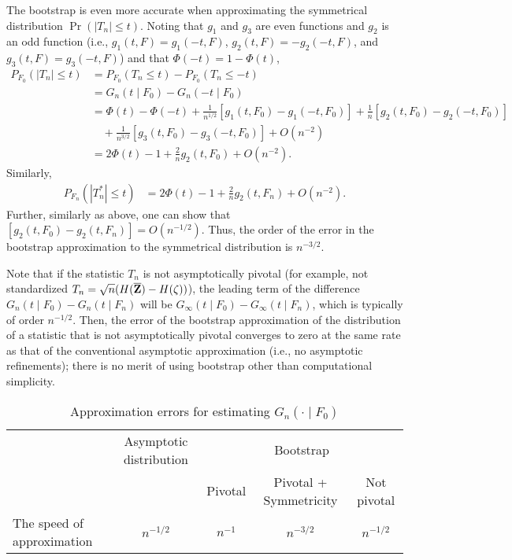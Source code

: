 \documentclass[11pt, A4paper, openany, uplatex]{book}
\begin{document}
The bootstrap is even more accurate when approximating the symmetrical distribution $\Pr(|T_n| \le t)$.
Noting that $g_1$ and $g_3$ are even functions and $g_2$ is an odd function (i.e., $g_1(t, F) = g_1(-t, F)$, $g_2(t, F) = - g_2(-t, F)$, and $g_3(t, F) = g_3(-t, F)$) and that $\Phi(-t) = 1 - \Phi(t)$,
\begin{align*}
	P_{F_0}(|T_n| \le t) 
	& = P_{F_0}(T_n \le t) -  P_{F_0}(T_n \le - t) \\
	& = G_n(t \mid F_0) - G_n( - t \mid F_0) \\
	& = \Phi(t) - \Phi(-t) + \frac{1}{n^{1/2}}[g_1(t, F_0) - g_1(-t, F_0)] + \frac{1}{n}[g_2(t, F_0) - g_2(-t, F_0)] \\
	& \quad + \frac{1}{n^{3/2}} [g_3(t, F_0) - g_3(-t, F_0)] + O(n^{-2}) \\
	& = 2 \Phi(t) - 1 + \frac{2}{n}g_2(t, F_0) + O(n^{-2}).
\end{align*}
Similarly,
\begin{align*}
	P_{F_n}(|T_n^*| \le t) 
	& = 2 \Phi(t) - 1 + \frac{2}{n}g_2(t, F_n) + O(n^{-2}).
\end{align*}
Further, similarly as above, one can show that $[g_2(t, F_0) - g_2(t, F_n)] = O(n^{-1/2})$.
Thus, the order of the error in the bootstrap approximation to the symmetrical distribution is $n^{-3/2}$.

Note that if the statistic $T_n$ is not asymptotically pivotal (for example, not standardized $T_n = \sqrt{n}(H(\overline{\mathbf{Z}}) - H(\zeta))$), the leading term of the difference $G_n(t \mid F_0) - G_n(t \mid F_n)$ will be $G_\infty(t \mid F_0) - G_\infty(t \mid F_n)$, which is typically of order $n^{-1/2}$.
Then, the error of the bootstrap approximation of the distribution
of a statistic that is not asymptotically pivotal converges to zero at the same rate as that of the conventional asymptotic approximation (i.e., no asymptotic refinements); there is no merit of using bootstrap other than  computational simplicity.

\begin{table}[h]
	\caption{Approximation errors for estimating $G_n(\cdot \mid F_0)$}
	\begin{tabular}{l|cccc}
		\hline
	& Asymptotic distribution     & \multicolumn{3}{c}{Bootstrap}    \\
    &                             & Pivotal                   & Pivotal + Symmetricity         & Not pivotal                 \\
		\hline
	The speed of approximation & $n^{-1/2}$ & $n^{-1}$ & $n^{-3/2}$ & $n^{-1/2}$ \\
		\hline
	\end{tabular}
\end{table}
\end{document}
